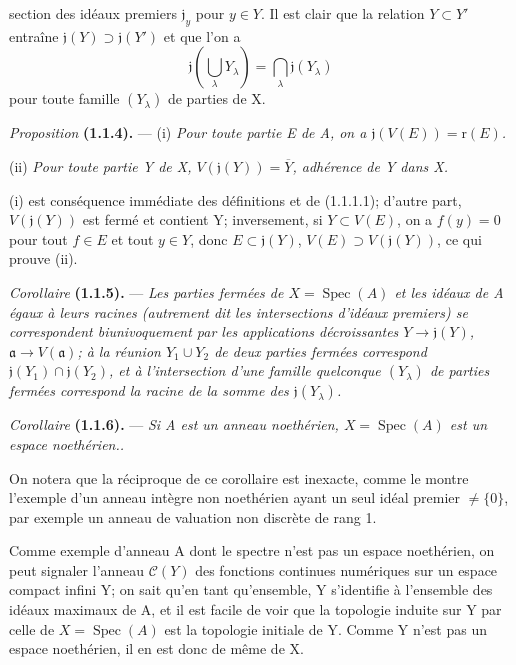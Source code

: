 section des idéaux premiers $\mathfrak j_y$ pour $y\in Y$. Il est clair que la relation $Y\subset Y'$ entraîne $\mathfrak j(Y)\supset\mathfrak j(Y')$ et que l'on a
\[
\mathfrak j(\bigcup_\lambda Y_\lambda)=\bigcap_\lambda\mathfrak j(Y_\lambda)\tag{1.1.3.1}
\]
pour toute famille $(Y_\lambda)$ de parties de X.

\textit{Proposition} \textbf{(1.1.4).} --- (i) \textit{Pour toute partie E de A, on a $\mathfrak j(V(E))=\mathrm r(E)$.}

(ii) \textit{Pour toute partie Y de X, $V(\mathfrak j(Y))=\overline Y$, adhérence de Y dans X.}

(i) est conséquence immédiate des définitions et de (1.1.1.1); d'autre part, $V(\mathfrak j(Y))$ est fermé et contient Y; inversement, si $Y\subset V(E)$, on a $f(y)=0$ pour tout $f\in E$ et tout $y\in Y$, donc $E\subset\mathfrak j(Y)$, $V(E)\supset V(\mathfrak j(Y))$, ce qui prouve (ii).

\textit{Corollaire} \textbf{(1.1.5).} --- \textit{Les parties fermées de $X=\operatorname{Spec}(A)$ et les idéaux de A égaux à leurs racines (autrement dit les intersections d'idéaux premiers) se correspondent biunivoquement par les applications décroissantes $Y\to\mathfrak j(Y)$, $\mathfrak a\to V(\mathfrak a)$; à la réunion $Y_1\cup Y_2$ de deux parties fermées correspond $\mathfrak j(Y_1)\cap\mathfrak j(Y_2)$, et à l'intersection d'une famille quelconque $(Y_\lambda)$ de parties fermées correspond la racine de la somme des $\mathfrak j(Y_\lambda)$.}

\textit{Corollaire} \textbf{(1.1.6).} --- \textit{Si A est un anneau noethérien, $X=\operatorname{Spec}(A)$ est un espace noethérien..}

On notera que la réciproque de ce corollaire est inexacte, comme le montre l'exemple d'un anneau intègre non noethérien ayant un seul idéal premier $\ne\{0\}$, par exemple un anneau de valuation non discrète de rang 1.

Comme exemple d'anneau A dont le spectre n'est pas un espace noethérien, on peut signaler l'anneau $\mathcal C(Y)$ des fonctions continues numériques sur un espace compact infini Y; on sait qu'en tant qu'ensemble, Y s'identifie à l'ensemble des idéaux maximaux de A, et il est facile de voir que la topologie induite sur Y par celle de $X=\operatorname{Spec}(A)$ est la topologie initiale de Y. Comme Y n'est pas un espace noethérien, il en est donc de même de X.

